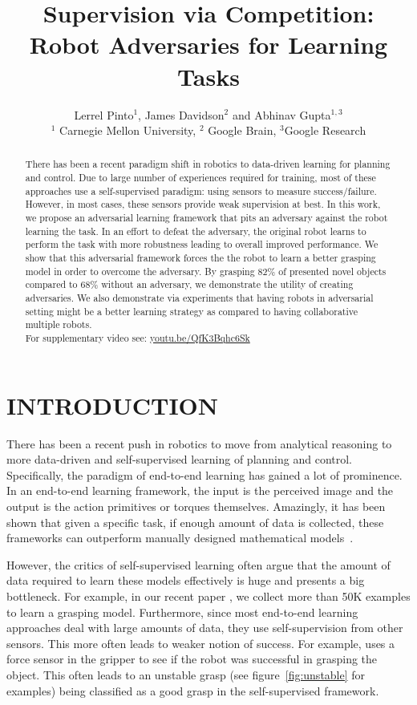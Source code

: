 \documentclass[letterpaper, 10 pt, conference]{ieeeconf}  %
\title{\LARGE \bf Supervision via Competition: Robot Adversaries for Learning Tasks}
\author{Lerrel Pinto$^{1}$, James Davidson$^{2}$ and Abhinav Gupta$^{1,3}$\\
$^{1}$ Carnegie Mellon University, $^{2}$ Google Brain, $^{3}$Google Research
}
\begin{document}
\maketitle
\thispagestyle{empty}
\pagestyle{empty}
\begin{abstract}
There has been a recent paradigm shift in robotics to data-driven learning for planning and control. Due to large number of experiences required for training, most of these approaches use a self-supervised paradigm: using sensors to measure success/failure. However, in most cases, these sensors provide weak supervision at best. In this work, we propose an adversarial learning framework that pits an adversary against the robot learning the task. In an effort to defeat the adversary, the original robot learns to perform the task with more robustness leading to overall improved performance. We show that this adversarial framework forces the the robot to learn a better grasping model in order to overcome the adversary. By grasping 82\% of presented novel objects compared to 68\% without an adversary, we demonstrate the utility of creating adversaries. We also demonstrate via experiments that having robots in adversarial setting might be a better learning strategy as compared to having collaborative multiple robots.
\\
\noindent For supplementary video see: \url{youtu.be/QfK3Bqhc6Sk}



\end{abstract}
\vspace{0.2in}\section{INTRODUCTION}
There has been a recent push in robotics to move from analytical reasoning to more data-driven and self-supervised learning of planning and control. Specifically, the paradigm of end-to-end learning has gained a lot of prominence. In an end-to-end learning framework, the input is the perceived image and the output is the action primitives or torques themselves. Amazingly, it has been shown that given a specific task, if enough amount of data is collected, these frameworks can outperform manually designed mathematical models~\cite{lenz2015deep, pinto2016supersizing, levine2016end, levine2016learning}.

However, the critics of self-supervised learning often argue that the amount of data required to learn these models effectively is huge and presents a big bottleneck. For example, in our recent paper \cite{pinto2016supersizing}, we collect more than 50K examples to learn a grasping model. Furthermore, since most end-to-end learning approaches deal with large amounts of data, they use self-supervision from other sensors. This more often leads to weaker notion of success. For example, \cite{pinto2016supersizing} uses a force sensor in the gripper to see if the robot was successful in grasping the object. This often leads to an unstable grasp (see figure~\ref{fig:unstable} for examples) being classified as a good grasp in the self-supervised framework. 
\end{document}
